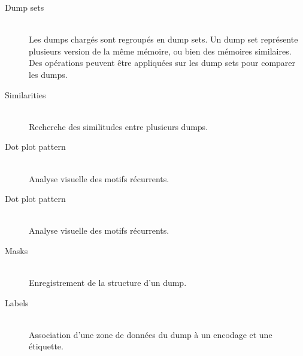 \begin{description}
  \item[Dump sets] \hfill \\
  Les dumps chargés sont regroupés en dump sets. Un dump set représente plusieurs version de la même mémoire, ou bien des mémoires similaires. Des opérations peuvent être appliquées sur les dump sets pour comparer les dumps.

  \item[Similarities] \hfill \\
  Recherche des similitudes entre plusieurs dumps.

  \item[Dot plot pattern] \hfill \\
  Analyse visuelle des motifs récurrents.

  \item[Dot plot pattern] \hfill \\
  Analyse visuelle des motifs récurrents.

  \item[Masks] \hfill \\
  Enregistrement de la structure d'un dump.

  \item[Labels] \hfill \\
  Association d'une zone de données du dump à un encodage et une étiquette.
\end{description}
